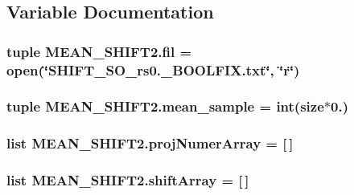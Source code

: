 \subsection{Variable Documentation}
\hypertarget{namespaceMEAN__SHIFT2_a429b645482b4f4848eac1d7ccab15bb8}{
\subsubsection[{fil}]{\setlength{\rightskip}{0pt plus 5cm}tuple M\-E\-A\-N\-\_\-\-S\-H\-I\-F\-T2.\-fil = open(\char`\"{}S\-H\-I\-F\-T\-\_\-S\-O\-\_\-rs0.\-\_\-\-B\-O\-O\-L\-F\-I\-X.\-txt\char`\"{}, \char`\"{}r\char`\"{})}}\label{namespaceMEAN__SHIFT2_a429b645482b4f4848eac1d7ccab15bb8}
\hypertarget{namespaceMEAN__SHIFT2_aa93731cd8c0824625a82574955eb220f}{
\subsubsection[{mean\-\_\-sample}]{\setlength{\rightskip}{0pt plus 5cm}tuple M\-E\-A\-N\-\_\-\-S\-H\-I\-F\-T2.\-mean\-\_\-sample = int({\bf size}$\ast$0.)}}\label{namespaceMEAN__SHIFT2_aa93731cd8c0824625a82574955eb220f}
\hypertarget{namespaceMEAN__SHIFT2_ab52cb1545ab067638f1ed65ce37690e1}{
\subsubsection[{proj\-Numer\-Array}]{\setlength{\rightskip}{0pt plus 5cm}list M\-E\-A\-N\-\_\-\-S\-H\-I\-F\-T2.\-proj\-Numer\-Array = \mbox{[}$\,$\mbox{]}}}\label{namespaceMEAN__SHIFT2_ab52cb1545ab067638f1ed65ce37690e1}
\hypertarget{namespaceMEAN__SHIFT2_a84af3541352c1d75a94b9d21f5ceb9e2}{
\subsubsection[{shift\-Array}]{\setlength{\rightskip}{0pt plus 5cm}list M\-E\-A\-N\-\_\-\-S\-H\-I\-F\-T2.\-shift\-Array = \mbox{[}$\,$\mbox{]}}}\label{namespaceMEAN__SHIFT2_a84af3541352c1d75a94b9d21f5ceb9e2}
